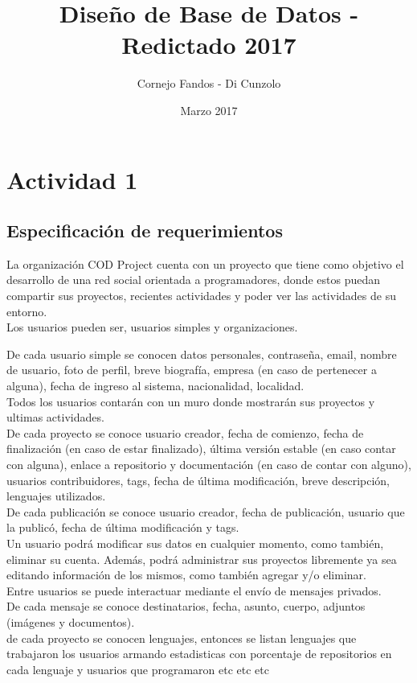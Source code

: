 \documentclass[a4paper,10pt]{article}
\title{Diseño de Base de Datos - Redictado 2017}
\author{Cornejo Fandos - Di Cunzolo}
\date{Marzo 2017}
\begin{document}
\maketitle

\section{Actividad 1}
    \subsection{Especificación de requerimientos}
    
    La organización COD Project cuenta con un proyecto que tiene como objetivo el desarrollo de una red social orientada a programadores, donde estos puedan compartir sus proyectos, recientes actividades y poder ver las actividades de su entorno. \\
    
    Los usuarios pueden ser, usuarios simples y organizaciones.
    
    De cada usuario simple se conocen datos personales, contraseña, email, nombre de usuario, foto de perfil, breve biografía, empresa (en caso de pertenecer a alguna), fecha de ingreso al sistema, nacionalidad, localidad. \\
    
   
    
    Todos los usuarios contarán con un muro donde mostrarán sus proyectos y ultimas actividades. \\
    De cada proyecto se conoce usuario creador, fecha de comienzo, fecha de finalización (en caso de estar finalizado), última versión estable (en caso contar con alguna), enlace a repositorio y documentación (en caso de contar con alguno), usuarios contribuidores, tags, fecha de última modificación, breve descripción, lenguajes utilizados. \\
    
    De cada publicación se conoce usuario creador, fecha de publicación, usuario que la publicó, fecha de última modificación y tags. \\
    
    Un usuario podrá modificar sus datos en cualquier momento, como también, eliminar su cuenta. Además, podrá administrar sus proyectos libremente ya sea editando información de los mismos, como también agregar y/o eliminar. \\
    
    Entre usuarios se puede interactuar mediante el envío de mensajes privados. \\
    De cada mensaje se conoce destinatarios, fecha, asunto, cuerpo, adjuntos (imágenes y documentos). \\
    

    
    

    
    
    
    
    
    de cada proyecto se conocen lenguajes, entonces se listan lenguajes que trabajaron los usuarios armando estadisticas con porcentaje de repositorios en cada lenguaje y usuarios que programaron etc etc etc
\end{document}
